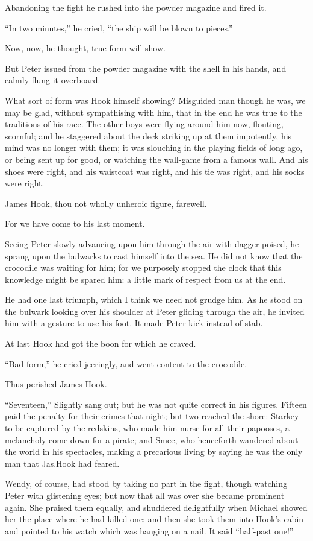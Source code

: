 Abandoning the fight he rushed into the powder magazine and fired it.

“In two minutes,” he cried, “the ship will be blown to pieces.”

Now, now, he thought, true form will show.

But Peter issued from the powder magazine with the shell in his hands,
and calmly flung it overboard.

What sort of form was Hook himself showing?
Misguided man though he was,
we may be glad, without sympathising with him,
that in the end he was true to the traditions of his race.
The other boys were flying around him now, flouting, scornful;
and he staggered about the deck striking up at them impotently,
his mind was no longer with them;
it was slouching in the playing fields of long ago, or being sent up for good,
or watching the wall-game from a famous wall.
And his shoes were right, and his waistcoat was right, and his tie was right, and his socks were right.

James Hook, thou not wholly unheroic figure, farewell.

For we have come to his last moment.

Seeing Peter slowly advancing upon him through the air with dagger poised,
he sprang upon the bulwarks to cast himself into the sea.
He did not know that the crocodile was waiting for him;
for we purposely stopped the clock that this knowledge might be spared him:
a little mark of respect from us at the end.

He had one last triumph, which I think we need not grudge him.
As he stood on the bulwark looking over his shoulder at Peter gliding through the air,
he invited him with a gesture to use his foot.
It made Peter kick instead of stab.

At last Hook had got the boon for which he craved.

“Bad form,” he cried jeeringly, and went content to the crocodile.

Thus perished James Hook.

“Seventeen,” Slightly sang out;
but he was not quite correct in his figures.
Fifteen paid the penalty for their crimes that night;
but two reached the shore:
Starkey to be captured by the redskins,
who made him nurse for all their papooses, a melancholy come-down for a pirate;
and Smee, who henceforth wandered about the world in his spectacles,
making a precarious living by saying he was the only man that Jas.\@ Hook had feared.

Wendy, of course, had stood by taking no part in the fight,
though watching Peter with glistening eyes;
but now that all was over she became prominent again.
She praised them equally, and shuddered delightfully when Michael showed her the place where he had killed one;
and then she took them into Hook’s cabin and pointed to his watch which was hanging on a nail.
It said “half-past one!”

